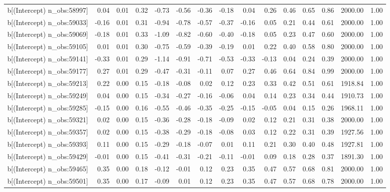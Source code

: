 \begin{table}[ht]
\begin{tabular}{rrrrrrrrrrrrrrr}
  b[(Intercept) n\_obs:58997] & 0.04 & 0.01 & 0.32 & -0.73 & -0.56 & -0.36 & -0.18 & 0.04 & 0.26 & 0.46 & 0.65 & 0.86 & 2000.00 & 1.00 \\ 
  b[(Intercept) n\_obs:59033] & -0.16 & 0.01 & 0.31 & -0.94 & -0.78 & -0.57 & -0.37 & -0.16 & 0.05 & 0.21 & 0.44 & 0.61 & 2000.00 & 1.00 \\ 
  b[(Intercept) n\_obs:59069] & -0.18 & 0.01 & 0.33 & -1.09 & -0.82 & -0.60 & -0.40 & -0.18 & 0.05 & 0.23 & 0.47 & 0.60 & 2000.00 & 1.00 \\ 
  b[(Intercept) n\_obs:59105] & 0.01 & 0.01 & 0.30 & -0.75 & -0.59 & -0.39 & -0.19 & 0.01 & 0.22 & 0.40 & 0.58 & 0.80 & 2000.00 & 1.00 \\ 
  b[(Intercept) n\_obs:59141] & -0.33 & 0.01 & 0.29 & -1.14 & -0.91 & -0.71 & -0.53 & -0.33 & -0.13 & 0.04 & 0.24 & 0.39 & 2000.00 & 1.00 \\ 
  b[(Intercept) n\_obs:59177] & 0.27 & 0.01 & 0.29 & -0.47 & -0.31 & -0.11 & 0.07 & 0.27 & 0.46 & 0.64 & 0.84 & 0.99 & 2000.00 & 1.00 \\ 
  b[(Intercept) n\_obs:59213] & 0.22 & 0.00 & 0.15 & -0.18 & -0.08 & 0.02 & 0.12 & 0.23 & 0.33 & 0.42 & 0.51 & 0.61 & 1918.84 & 1.00 \\ 
  b[(Intercept) n\_obs:59249] & 0.04 & 0.00 & 0.15 & -0.34 & -0.27 & -0.16 & -0.06 & 0.04 & 0.14 & 0.23 & 0.34 & 0.44 & 1910.73 & 1.00 \\ 
  b[(Intercept) n\_obs:59285] & -0.15 & 0.00 & 0.16 & -0.55 & -0.46 & -0.35 & -0.25 & -0.15 & -0.05 & 0.04 & 0.15 & 0.26 & 1968.11 & 1.00 \\ 
  b[(Intercept) n\_obs:59321] & 0.02 & 0.00 & 0.15 & -0.36 & -0.28 & -0.18 & -0.09 & 0.02 & 0.12 & 0.21 & 0.31 & 0.38 & 2000.00 & 1.00 \\ 
  b[(Intercept) n\_obs:59357] & 0.02 & 0.00 & 0.15 & -0.38 & -0.29 & -0.18 & -0.08 & 0.03 & 0.12 & 0.22 & 0.31 & 0.39 & 1927.56 & 1.00 \\ 
  b[(Intercept) n\_obs:59393] & 0.11 & 0.00 & 0.15 & -0.29 & -0.18 & -0.07 & 0.01 & 0.11 & 0.21 & 0.30 & 0.40 & 0.48 & 1927.81 & 1.00 \\ 
  b[(Intercept) n\_obs:59429] & -0.01 & 0.00 & 0.15 & -0.41 & -0.31 & -0.21 & -0.11 & -0.01 & 0.09 & 0.18 & 0.28 & 0.37 & 1891.30 & 1.00 \\ 
  b[(Intercept) n\_obs:59465] & 0.35 & 0.00 & 0.18 & -0.12 & -0.01 & 0.12 & 0.23 & 0.35 & 0.47 & 0.57 & 0.68 & 0.81 & 2000.00 & 1.00 \\ 
  b[(Intercept) n\_obs:59501] & 0.35 & 0.00 & 0.17 & -0.09 & 0.01 & 0.12 & 0.23 & 0.35 & 0.47 & 0.57 & 0.68 & 0.78 & 2000.00 & 1.00 \\ 

\end{tabular}
\end{table}

